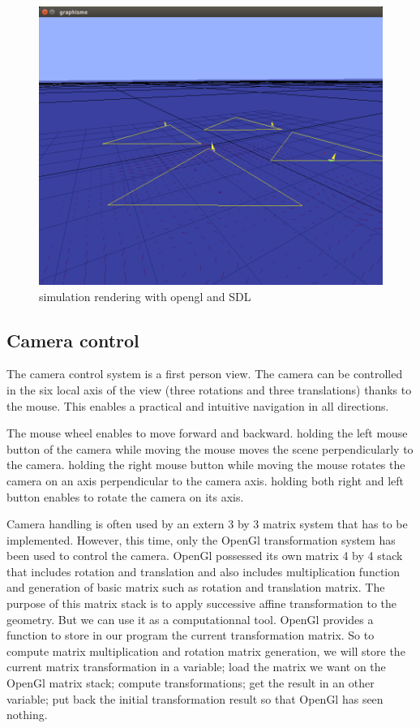 \documentclass[a4paper]{report}
\begin{document}
\begin{figure}[H]
	\centering
    \includegraphics[scale=0.4]{image/shepherd_opengl.png}
    \caption{simulation rendering with opengl and SDL}
\end{figure}


\subsection{Camera control}

The camera control system is a first person view. The camera can be controlled in the six local axis of the view (three rotations and three translations) thanks to the mouse. This enables a practical and intuitive navigation in all directions.

The mouse wheel enables to move forward and backward. holding the left mouse button of the camera while moving the mouse moves the scene perpendicularly to the camera. holding the right mouse button while moving the mouse rotates the camera on an axis perpendicular to the camera axis. holding both right and left button enables to rotate the camera on its axis.

Camera handling is often used by an extern 3 by 3 matrix system that has to be implemented. However, this time, only the OpenGl transformation system has been used to control the camera. OpenGl possessed its own matrix 4 by 4 stack that includes rotation and translation and also includes multiplication function and generation of basic matrix such as rotation and translation matrix. The purpose of this matrix stack is to apply successive affine transformation to the geometry. But we can use it as a computationnal tool. OpenGl provides a function to store in our program the current transformation matrix. So to compute matrix multiplication and rotation matrix generation, we will store the current matrix transformation in a variable; load the matrix we want on the OpenGl matrix stack; compute transformations; get the result in an other variable; put back the initial transformation result so that OpenGl has seen nothing.
\end{document}
